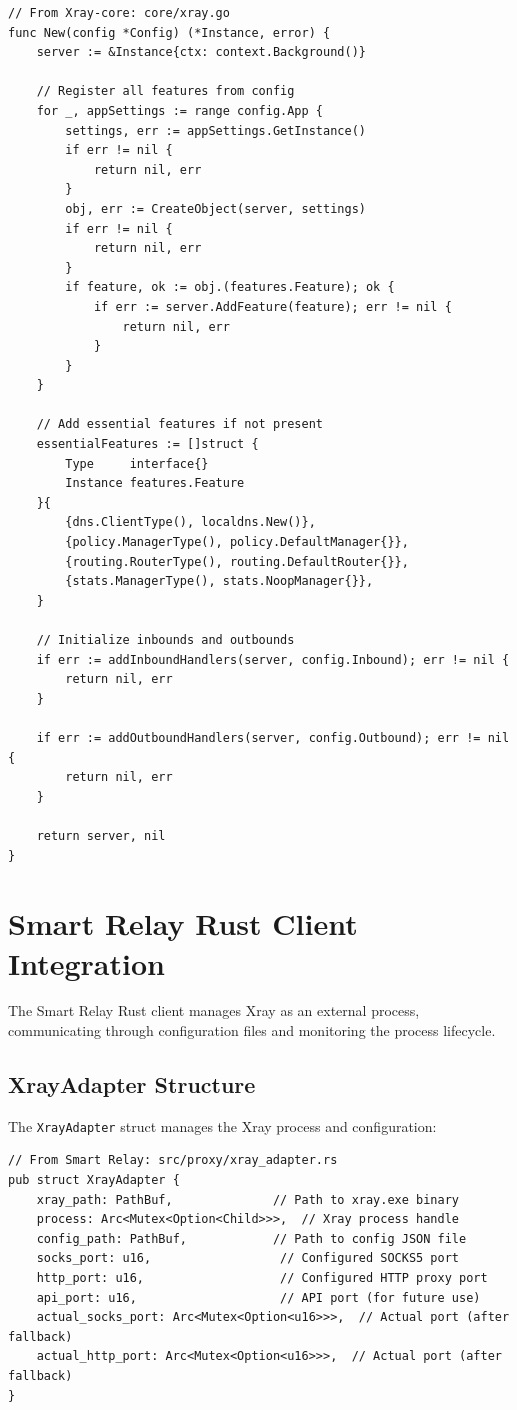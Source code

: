 \begin{verbatim}
// From Xray-core: core/xray.go
func New(config *Config) (*Instance, error) {
    server := &Instance{ctx: context.Background()}
    
    // Register all features from config
    for _, appSettings := range config.App {
        settings, err := appSettings.GetInstance()
        if err != nil {
            return nil, err
        }
        obj, err := CreateObject(server, settings)
        if err != nil {
            return nil, err
        }
        if feature, ok := obj.(features.Feature); ok {
            if err := server.AddFeature(feature); err != nil {
                return nil, err
            }
        }
    }
    
    // Add essential features if not present
    essentialFeatures := []struct {
        Type     interface{}
        Instance features.Feature
    }{
        {dns.ClientType(), localdns.New()},
        {policy.ManagerType(), policy.DefaultManager{}},
        {routing.RouterType(), routing.DefaultRouter{}},
        {stats.ManagerType(), stats.NoopManager{}},
    }
    
    // Initialize inbounds and outbounds
    if err := addInboundHandlers(server, config.Inbound); err != nil {
        return nil, err
    }
    
    if err := addOutboundHandlers(server, config.Outbound); err != nil {
        return nil, err
    }
    
    return server, nil
}
\end{verbatim}

\section{Smart Relay Rust Client Integration}

The Smart Relay Rust client manages Xray as an external process, communicating through configuration files and monitoring the process lifecycle.

\subsection{XrayAdapter Structure}

The \texttt{XrayAdapter} struct manages the Xray process and configuration:

\begin{verbatim}
// From Smart Relay: src/proxy/xray_adapter.rs
pub struct XrayAdapter {
    xray_path: PathBuf,              // Path to xray.exe binary
    process: Arc<Mutex<Option<Child>>>,  // Xray process handle
    config_path: PathBuf,            // Path to config JSON file
    socks_port: u16,                  // Configured SOCKS5 port
    http_port: u16,                   // Configured HTTP proxy port
    api_port: u16,                    // API port (for future use)
    actual_socks_port: Arc<Mutex<Option<u16>>>,  // Actual port (after fallback)
    actual_http_port: Arc<Mutex<Option<u16>>>,  // Actual port (after fallback)
}
\end{verbatim}

